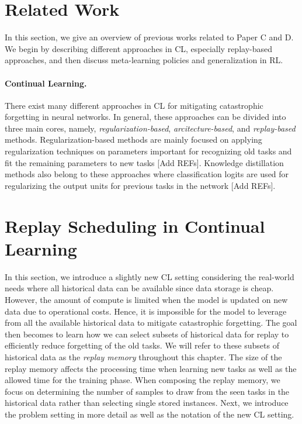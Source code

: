 \section{Related Work}\label{ch4/sec:related_work}

In this section, we give an overview of previous works related to Paper C and D. We begin by describing different approaches in CL, especially replay-based approaches, and then discuss meta-learning policies and generalization in RL.

\paragraph{Continual Learning.} There exist many different approaches in CL for mitigating catastrophic forgetting in neural networks. In general, these approaches can be divided into three main cores, namely, \textit{regularization-based}, \textit{arcitecture-based}, and \textit{replay-based} methods. Regularization-based methods are mainly focused on applying regularization techniques on parameters important for recognizing old tasks and fit the remaining parameters to new tasks [Add REFs]. Knowledge distillation methods also belong to these approaches where classification logits are used for regularizing the output units for previous tasks in the network [Add REFs].  



\section{Replay Scheduling in Continual Learning} 

In this section, we introduce a slightly new CL setting considering the real-world needs where all historical data can be available since data storage is cheap. However, the amount of compute is limited when the model is updated on new data due to operational costs. Hence, it is impossible for the model to leverage from all the available historical data to mitigate catastrophic forgetting. The goal then becomes to learn how we can select subsets of historical data for replay to efficiently reduce forgetting of the old tasks. We will refer to these subsets of historical data as the \textit{replay memory} throughout this chapter. The size of the replay memory affects the processing time when learning new tasks as well as the allowed time for the training phase. When composing the replay memory, we focus on determining the number of samples to draw from the seen tasks in the historical data rather than selecting single stored instances. Next, we introduce the problem setting in more detail as well as the notation of the new CL setting. 


